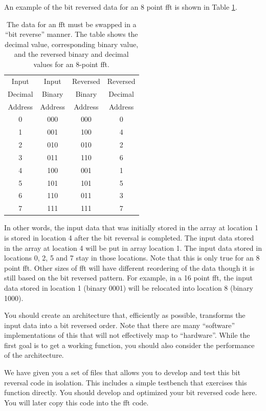 An example of the bit reversed data for an 8 point \gls{fft} is shown in Table \ref{tab:bit_reverse}.
\begin{table}[htbp]
\caption{The data for an \gls{fft} must be swapped in a ``bit reverse'' manner. The table shows the decimal value, corresponding binary value, and the reversed binary and decimal values for an 8-point \gls{fft}. }
\begin{center}
\begin{tabular}{|c|c|c|c|}
\hline
Input & Input  & Reversed  & Reversed  \\
Decimal & Binary & Binary & Decimal \\
Address & Address & Address & Address \\
\hline
0 & 000 & 000 & 0 \\
\hline
1	& 001 &	100	& 4 \\
\hline
2	& 010	& 010	& 2 \\
\hline
3	& 011	& 110	& 6 \\ 
\hline
4	& 100	& 001	& 1 \\
\hline
5	& 101	& 101	& 5 \\
\hline
6	& 110	& 011	& 3 \\
\hline
7	& 111	& 111	& 7 \\
\hline
\end{tabular}
\end{center}
\label{tab:bit_reverse}
\end{table}%

In other words, the input data that was initially stored in the array at location 1 is stored in location 4 after the bit reversal is completed. The input data stored in the array at location 4 will be put in array location 1. The input data stored in locations 0, 2, 5 and 7 stay in those locations. Note that this is only true for an 8 point \gls{fft}. Other sizes of \gls{fft} will have different reordering of the data though it is still based on the bit reversed pattern. For example, in a 16 point \gls{fft}, the input data stored in location 1 (binary 0001) will be relocated into location 8 (binary 1000).

You should create an architecture that, efficiently as possible, transforms the input data into a bit reversed order. Note that there are many ``software'' implementations of this that will not effectively map to ``hardware''. While the first goal is to get a working function, you should also consider the performance of the architecture.

We have given you a set of files that allows you to develop and test this bit reversal code in isolation. This includes a simple testbench that exercises this function directly. You should develop and optimized your bit reversed code here. You will later copy this code into the \gls{fft} code.

